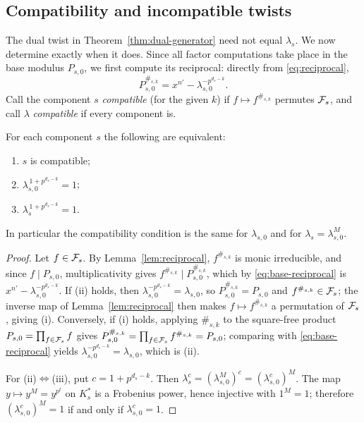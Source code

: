 \subsection{Compatibility and incompatible twists}\label{sec:compatibility}

The dual twist in Theorem~\ref{thm:dual-generator} need not equal $\lambda_s$.
We now determine exactly when it does.  Since all factor computations take place
in the base modulus $P_{s,0}$, we first compute its reciprocal: directly from
\eqref{eq:reciprocal},
\begin{equation}\label{eq:base-reciprocal}
P_{s,0}^{\#_{s,k}}
   =x^{n'}-\lambda_{s,0}^{-p^{d_s-k}}.
\end{equation}
Call the component $s$ \emph{compatible} (for the given $k$) if
$f\mapsto f^{\#_{s,k}}$ permutes $\mathcal F_s$, and call $\lambda$ \emph{compatible} if
every component is.

\begin{proposition}\label{prop:compatibility}
For each component $s$ the following are equivalent:
\begin{enumerate}
\item[\textup{(i)}] $s$ is compatible;
\item[\textup{(ii)}] $\lambda_{s,0}^{\,1+p^{d_s-k}}=1$;
\item[\textup{(iii)}] $\lambda_s^{\,1+p^{d_s-k}}=1$.
\end{enumerate}
In particular the compatibility condition is the same for $\lambda_{s,0}$ and
for $\lambda_s=\lambda_{s,0}^M$.
\end{proposition}

\begin{proof}
Let $f\in\mathcal F_s$.  By Lemma~\ref{lem:reciprocal}, $f^{\#_{s,k}}$ is monic
irreducible, and since $f\mid P_{s,0}$, multiplicativity gives
$f^{\#_{s,k}}\mid P_{s,0}^{\#_{s,k}}$, which by \eqref{eq:base-reciprocal} is
$x^{n'}-\lambda_{s,0}^{-p^{d_s-k}}$.  If (ii) holds, then
$\lambda_{s,0}^{-p^{d_s-k}}=\lambda_{s,0}$, so
$P_{s,0}^{\#_{s,k}}=P_{s,0}$ and $f^{\#_{s,k}}\in\mathcal F_s$; the inverse map of
Lemma~\ref{lem:reciprocal} then makes $f\mapsto f^{\#_{s,k}}$ a permutation of
$\mathcal F_s$, giving (i).  Conversely, if (i) holds, applying $\#_{s,k}$ to the
square-free product $P_{s,0}=\prod_{f\in\mathcal F_s}f$ gives
$P_{s,0}^{\#_{s,k}}=\prod_{f\in\mathcal F_s}f^{\#_{s,k}}=P_{s,0}$; comparing with
\eqref{eq:base-reciprocal} yields
$\lambda_{s,0}^{-p^{d_s-k}}=\lambda_{s,0}$, which is (ii).

For (ii)$\Leftrightarrow$(iii), put $c=1+p^{d_s-k}$.  Then
$\lambda_s^c=(\lambda_{s,0}^M)^c=(\lambda_{s,0}^c)^M$.  The map
$y\mapsto y^M=y^{p^t}$ on $K_s^\ast$ is a Frobenius power, hence injective with
$1^M=1$; therefore $(\lambda_{s,0}^c)^M=1$ if and only if
$\lambda_{s,0}^c=1$.
\end{proof}

